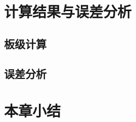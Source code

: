 \section[\hspace{-2pt}计算结果与误差分析]{{ \hspace{-8pt}计算结果与误差分析}}\label{section 5-4}
\subsection[\hspace{-2pt}板级计算]{{ \hspace{-8pt}板级计算}}
\subsection[\hspace{-2pt}误差分析]{{ \hspace{-8pt}误差分析}}
\section[\hspace{-2pt}本章小结]{{ \hspace{-8pt}本章小结}}\label{section 5-5}



